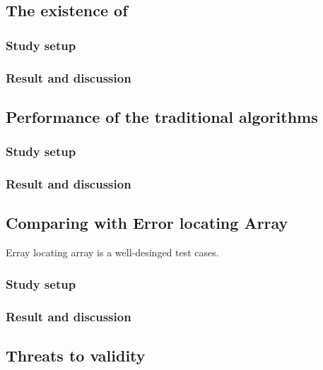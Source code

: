 \documentclass{sig-alternate}
\begin{document}
\subsection{The existence of }


\subsubsection{Study setup}


\subsubsection{Result and discussion}


\subsection{Performance of the traditional algorithms}

\subsubsection{Study setup}

\subsubsection{Result and discussion}


\subsection{Comparing with Error locating Array}
Erray locating array is a well-desinged test cases.


\subsubsection{Study setup}



\subsubsection{Result and discussion}


\subsection{Threats to validity}
\end{document}
